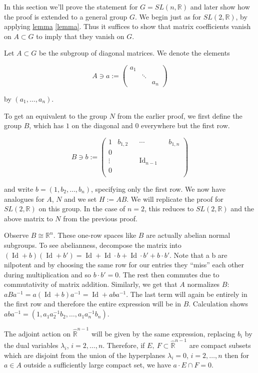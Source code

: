 \documentclass[
  12pt
]{article}
\theoremstyle{break}
\theoremstyle{plain}
\newcommand{\G}{\ensuremath{G}\xspace}
\newcommand{\bbr}{\ensuremath{\mathbb{R}}\xspace}
\newcommand{\sltr}{\ensuremath{SL(2, \mathbb{R})}\xspace}
\newcommand{\slnr}{\ensuremath{SL(n, \mathbb{R})}\xspace}
\DeclareMathOperator{\Id}{Id}
\begin{document}
  In this section we'll prove the statement for $G = \slnr$ and later show how
  the proof is extended to a general group \G. We begin just as for \sltr, by
  applying \hyperref[lemma]{lemma} \ref{lemma}. Thus it suffices to show that
  matrix coefficients vanish on $A \subset G$ to imply that they vanish on \G.

  Let $A \subset G$ be the subgroup of diagonal matrices. We denote the elements

  $$
  A \ni a := \begin{pmatrix}
    a_1 & & \\
        & \ddots & \\
        & & a_n
  \end{pmatrix}
  $$

  by $(a_1, \dots, a_n)$.

  To get an equivalent to the group $N$ from the earlier proof, we first define the group $B$, which has $1$ on the diagonal and $0$ everywhere but the first row.

  $$
    B \ni b := \begin{pmatrix}
      1 & b_{1,2} & & \cdots & & b_{1,n} \\
      0 & & &  & \\
      \vdots & & & \Id_{n-1} & \\
      0 & & & & \\
    \end{pmatrix}
  $$

  and write $b = (1, b_2, \dots, b_n)$, specifying only the first row.
  We now have analogues for $A$, $N$ and we set $H:=AB$. We will replicate the proof for \sltr on this group.
  In the case of $n = 2$, this reduces to \sltr and the above matrix to $N$ from the previous proof.

  Observe $B \cong \bbr^n$.
  These one-row spaces like $B$ are actually abelian normal subgroups.
  To see abelianness, decompose the matrix into $(\Id + b)(\Id +b') = \Id + \Id\cdot b + \Id\cdot b' + b\cdot b'$.
  Note that a b are nilpotent and by choosing the same row for our entries they
  ``miss'' each other during multiplication and so $b\cdot b' =0$. The rest then commutes
  due to commutativity of matrix addition.
  Similarly, we get that $A$ normalizes $B$: $aBa^{-1} = a(\Id + b)a^{-1} = \Id + aba^{-1}$.
  The last term will again be entirely in the first row and therefore the entire expression will be in $B$.
  Calculation shows $aba^{-1} = (1, a_1a_2^{-1}b_2, \dots, a_1a_n^{-1}b_n)$.

  The adjoint action on $\hat{\bbr}^{n-1}$ will be given by the same expression,
  replacing $b_i$ by the dual variables $\lambda_i$, $i = 2, \dots , n$.
  Therefore, if $E,\ F \subset \hat{\bbr}^{n-1}$ are
  compact subsets which are disjoint from the union of the hyperplanes $\lambda_i = 0$,
  $i = 2, \dots , n$ then for $a\in A$ outside a sufficiently large compact set, we have
  $a\cdot E \cap F = 0$.
\end{document}
